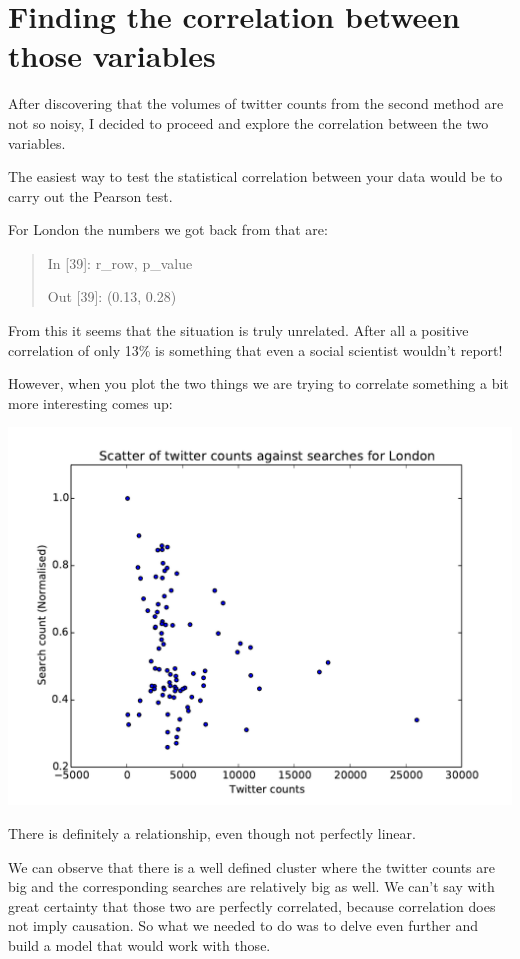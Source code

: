 \documentclass[minf,frontabs,twoside,singlespacing,parskip]{infthesis}
\begin{document}
\section{Finding the correlation between those variables}

After discovering that the volumes of twitter counts from the second method are not so noisy, I decided to proceed and explore the correlation between the two variables.

The easiest way to test the statistical correlation between your data would be to carry out the Pearson test.

For London the numbers we got back from that are:
\begin{quotation}
In [39]: r\_row, p\_value

Out [39]: (0.13, 0.28)
\end{quotation}

From this it seems that the situation is truly unrelated. After all a positive correlation of only 13\% is something that even a social scientist wouldn't report!

However, when you plot the two things we are trying to correlate something a bit more interesting comes up:

\includegraphics[width=\textwidth]{London}

There is definitely a relationship, even though not perfectly linear.

We can observe that there is a well defined cluster where the twitter counts are big and the corresponding searches are relatively big as well. We can't say with great certainty that those two are perfectly correlated, because correlation does not imply causation. So what we needed to do was to delve even further and build a model that would work with those.
\end{document}
